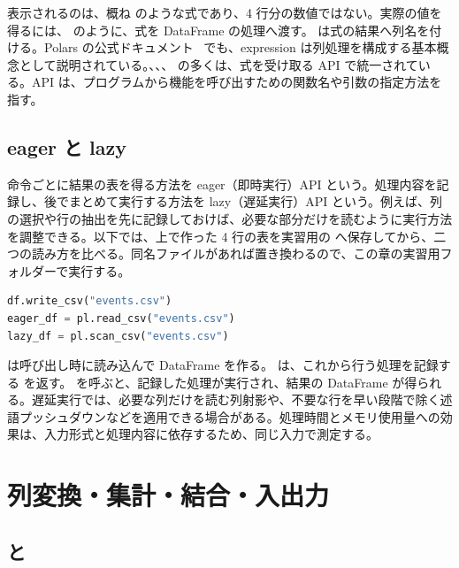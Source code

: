 表示されるのは、概ね  のような式であり、4 行分の数値ではない。実際の値を得るには、 のように、式を DataFrame の処理へ渡す。 は式の結果へ列名を付ける。Polars の公式ドキュメント~\cite{polars_expressions} でも、expression は列処理を構成する基本概念として説明されている。、、、 の多くは、式を受け取る API で統一されている。API は、プログラムから機能を呼び出すための関数名や引数の指定方法を指す。

\subsection{eager と lazy}

命令ごとに結果の表を得る方法を eager（即時実行）API という。処理内容を記録し、後でまとめて実行する方法を lazy（遅延実行）API という。例えば、列の選択や行の抽出を先に記録しておけば、必要な部分だけを読むように実行方法を調整できる。以下では、上で作った 4 行の表を実習用の  へ保存してから、二つの読み方を比べる。同名ファイルがあれば置き換わるので、この章の実習用フォルダーで実行する。

\begin{lstlisting}[language=Python]
df.write_csv("events.csv")
eager_df = pl.read_csv("events.csv")
lazy_df = pl.scan_csv("events.csv")
\end{lstlisting}

 は呼び出し時に読み込んで DataFrame を作る。 は、これから行う処理を記録する  を返す。 を呼ぶと、記録した処理が実行され、結果の DataFrame が得られる。遅延実行では、必要な列だけを読む列射影や、不要な行を早い段階で除く述語プッシュダウンなどを適用できる場合がある。処理時間とメモリ使用量への効果は、入力形式と処理内容に依存するため、同じ入力で測定する。

\section{列変換・集計・結合・入出力}

\subsection{ と }

